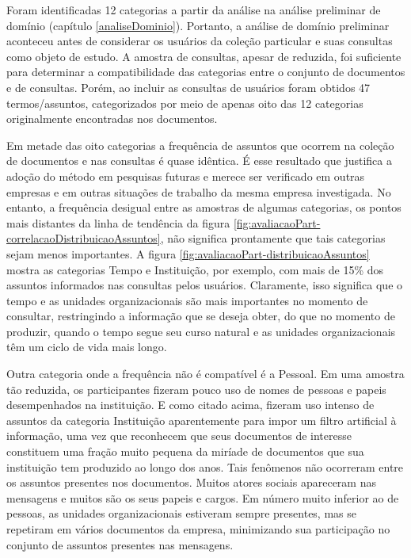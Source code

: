 Foram identificadas 12 categorias a partir da análise na análise preliminar de domínio (capítulo \ref{analiseDominio}). Portanto, a análise de domínio preliminar aconteceu antes de considerar os usuários da coleção particular e suas consultas como objeto de estudo. A amostra de consultas, apesar de reduzida, foi suficiente para determinar a compatibilidade das categorias entre o conjunto de documentos e de consultas. Porém, ao incluir as consultas de usuários foram obtidos 47 termos/assuntos, categorizados por meio de apenas oito das 12 categorias originalmente encontradas nos documentos. 

Em metade das oito categorias a frequência de assuntos que ocorrem na coleção de documentos e nas consultas é quase idêntica. É esse resultado que justifica a adoção do método em pesquisas futuras e merece ser verificado em outras empresas e em outras situações de trabalho da mesma empresa investigada. No entanto, a frequência desigual entre as amostras de algumas categorias, os pontos mais distantes da linha de tendência da figura \ref{fig:avaliacaoPart-correlacaoDistribuicaoAssuntos}, não significa prontamente que tais categorias sejam menos importantes. A figura \ref{fig:avaliacaoPart-distribuicaoAssuntos} mostra as categorias Tempo e Instituição, por exemplo, com mais de 15\% dos assuntos informados nas consultas pelos usuários. Claramente, isso significa que o tempo e as unidades organizacionais são mais importantes no momento de consultar, restringindo a informação que se deseja obter, do que no momento de produzir, quando o tempo segue seu curso natural e as unidades organizacionais têm um ciclo de vida mais longo.

Outra categoria onde a frequência não é compatível é a Pessoal. Em uma amostra tão reduzida, os participantes fizeram pouco uso de nomes de pessoas e papeis desempenhados na instituição. E como citado acima, fizeram uso intenso de assuntos da categoria Instituição aparentemente para impor um filtro artificial à informação, uma vez que reconhecem que seus documentos de interesse constituem uma fração muito pequena da miríade de documentos que sua instituição tem produzido ao longo dos anos. Tais fenômenos não ocorreram entre os assuntos presentes nos documentos. Muitos atores sociais apareceram nas mensagens e muitos são os seus papeis e cargos. Em número muito inferior ao de pessoas, as unidades organizacionais estiveram sempre presentes, mas se repetiram em vários documentos da empresa, minimizando sua participação no conjunto de assuntos presentes nas mensagens.

